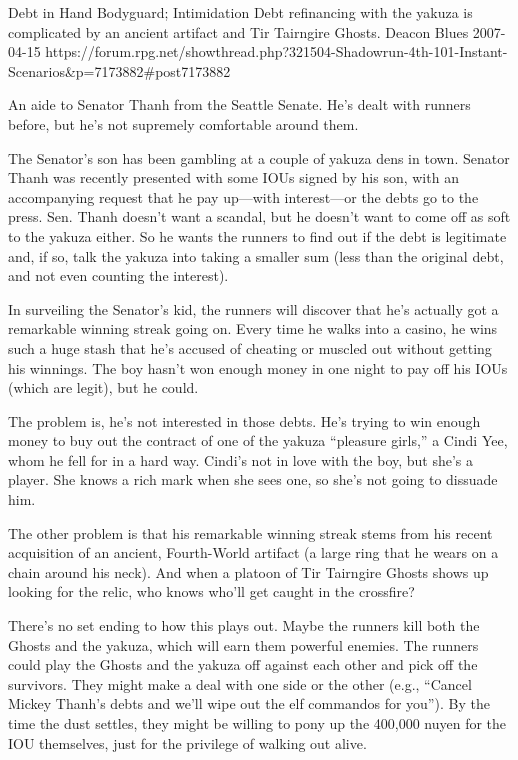 \begin{scenario}{Debt in Hand}
	{Bodyguard; Intimidation}
	{Debt refinancing with the yakuza is complicated by an ancient artifact and Tir Tairngire Ghosts.}
	{Deacon Blues}
	{2007-04-15}
	{https://forum.rpg.net/showthread.php?321504-Shadowrun-4th-101-Instant-Scenarios\&p=7173882\#post7173882}

An aide to Senator Thanh from the Seattle Senate. He's dealt with runners before, but he's not supremely comfortable around them.

\synopsis The Senator's son has been gambling at a couple of yakuza dens in town. Senator Thanh was recently presented with some IOUs signed by his son, with an accompanying request that he pay up---with interest---or the debts go to the press. Sen. Thanh doesn't want a scandal, but he doesn't want to come off as soft to the yakuza either. So he wants the runners to find out if the debt is legitimate and, if so, talk the yakuza into taking a smaller sum (less than the original debt, and not even counting the interest).

\twist In surveiling the Senator's kid, the runners will discover that he's actually got a remarkable winning streak going on. Every time he walks into a casino, he wins such a huge stash that he's accused of cheating or muscled out without getting his winnings. The boy hasn't won enough money in one night to pay off his IOUs (which are legit), but he could.

The problem is, he's not interested in those debts. He's trying to win enough money to buy out the contract of one of the yakuza ``pleasure girls,'' a Cindi Yee, whom he fell for in a hard way. Cindi's not in love with the boy, but she's a player. She knows a rich mark when she sees one, so she's not going to dissuade him.

The other problem is that his remarkable winning streak stems from his recent acquisition of an ancient, Fourth-World artifact (a large ring that he wears on a chain around his neck). And when a platoon of Tir Tairngire Ghosts shows up looking for the relic, who knows who'll get caught in the crossfire?

\notes  There's no set ending to how this plays out. Maybe the runners kill both the Ghosts and the yakuza, which will earn them powerful enemies. The runners could play the Ghosts and the yakuza off against each other and pick off the survivors. They might make a deal with one side or the other (e.g., ``Cancel Mickey Thanh's debts and we'll wipe out the elf commandos for you''). By the time the dust settles, they might be willing to pony up the 400,000 nuyen for the IOU themselves, just for the privilege of walking out alive. 

\end{scenario}
